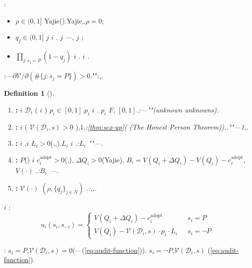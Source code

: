 \documentclass[12pt,a4paper]{article}
\theoremstyle{definition}
\newtheorem{definition}{Definition}[section]
\theoremstyle{remark}
\begin{document}
:
\begin{itemize}[itemsep=2pt]
\item $\rho \in (0, 1]$ Yajie().Yajie,,$\rho = 0$;
\item $q_j \in (0, 1]$  $j$  $i$ . $j$ ---, $j$ ;
\item  $\prod_{j: s_j = P} (1 - q_j)$ \textit{} $i$ . $i$ .
\end{itemize}

:---$\partial \mathcal{V} / \partial (\#\{j: s_j = P\}) > 0$."":,.

\begin{definition}[]
\label{def:ad-assumptions}
\begin{enumerate}[label=\textbf{D\arabic*}, leftmargin=*, itemsep=4pt]
\item \textbf{:}  $i$  $\mathcal{D}_i$ ( $i$ ) $p_i \in [0,1]$.$p_i$  $i$ . $p_i$  $F$, $[0,1]$.\hfill\textit{:---""(unknown unknowns).}

\item \textbf{:}  $i$ ( $\mathcal{V}(\mathcal{D}_i, s) > 0$ ),1.\hfill\textit{:\ref{thm:scx-up}( (The Honest Person Theorem))..""---1,.}

\item \textbf{:}  $i$ ,$i$  $L_i > 0$(,,).$L_i$  $i$ .\hfill\textit{:$L_i$ ""---.}

\item \textbf{:}  $P$() $i$  $c_i^{\text{adopt}} > 0$(,), $\Delta Q_i > 0$(Yajie). $B_i = V(Q_i + \Delta Q_i) - V(Q_i) - c_i^{\text{adopt}}$, $V(\cdot)$ .\hfill\textit{:$B_i$ ---.}

\item \textbf{:}  $\mathcal{V}(\cdot)$  $(\rho, \{q_j\}_{j \in N})$ .\hfill\textit{:,,.}
\end{enumerate}
\end{definition}

 $i$ :
\begin{equation}
u_i(s_i, s_{-i}) =
\begin{cases}
V(Q_i + \Delta Q_i) - c_i^{\text{adopt}} & \text{ } s_i = P \\
V(Q_i) - \mathcal{V}(\mathcal{D}_i, s) \cdot p_i \cdot L_i & \text{ } s_i = \neg P
\end{cases}
\label{eq:ad-payoffs}
\end{equation}

: $s_i = P$,$\mathcal{V}(\mathcal{D}_i, s) = 0$(---(\ref{eq:audit-function})). $s_i = \neg P$,$\mathcal{V}(\mathcal{D}_i, s)$ (\ref{eq:audit-function}).
\end{document}
